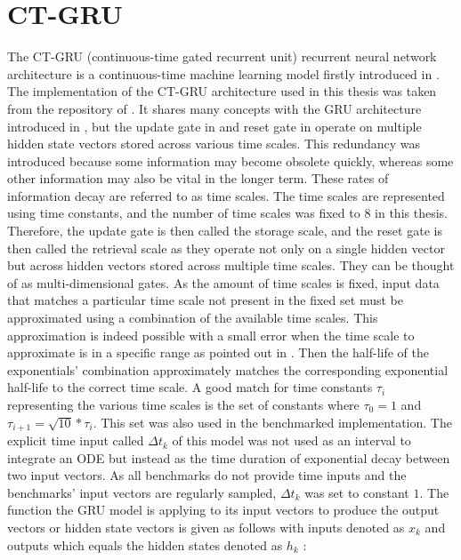 \documentclass[draft,final]{vutinfth} %
\begin{document}
    \section{CT-GRU} \label{ctgru}
    The CT-GRU (continuous-time gated recurrent unit) recurrent neural network architecture is a continuous-time machine learning model firstly introduced in \cite{CTGRU}.
    The implementation of the CT-GRU architecture used in this thesis was taken from the repository of \cite{ODELSTM}.
    It shares many concepts with the GRU architecture introduced in , but the update gate in  and reset gate in  operate on multiple hidden state vectors stored across various time scales.
    This redundancy was introduced because some information may become obsolete quickly, whereas some other information may also be vital in the longer term.
    These rates of information decay are referred to as time scales.
    The time scales are represented using time constants, and the number of time scales was fixed to $8$ in this thesis.
    Therefore, the update gate is then called the storage scale, and the reset gate is then called the retrieval scale as they operate not only on a single hidden vector but across hidden vectors stored across multiple time scales.
    They can be thought of as multi-dimensional gates.
    As the amount of time scales is fixed, input data that matches a particular time scale not present in the fixed set must be approximated using a combination of the available time scales.
    This approximation is indeed possible with a small error when the time scale to approximate is in a specific range as pointed out in \cite[p. 5-6]{CTGRU}.
    Then the half-life of the exponentials' combination approximately matches the corresponding exponential half-life to the correct time scale.
    A good match for time constants $\tau_i$ representing the various time scales is the set of constants where $\tau_0=1$ and $\tau_{i+1} = \sqrt{10} * \tau_{i}$.
    This set was also used in the benchmarked implementation.
    The explicit time input called $\Delta t_k$ of this model was not used as an interval to integrate an ODE but instead as the time duration of exponential decay between two input vectors.
    As all benchmarks do not provide time inputs and the benchmarks' input vectors are regularly sampled, $\Delta t_k$ was set to constant $1$.
    The function the GRU model is applying to its input vectors to produce the output vectors or hidden state vectors is given as follows with inputs denoted as $x_k$ and outputs which equals the hidden states denoted as $h_k$ \cite[p. 7]{CTGRU}:
\end{document}
